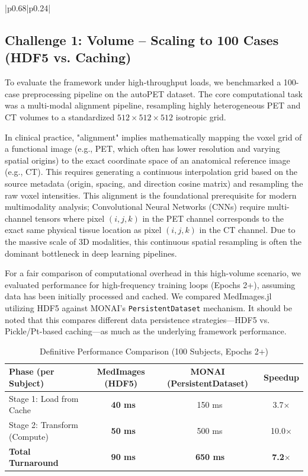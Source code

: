 \documentclass[10pt,letterpaper]{article}
\begin{document}
\begin{table}[H]
\begin{tabular}{|p{}|p{}|}
\subsection*{Challenge 1: Volume -- Scaling to 100 Cases (HDF5 vs. Caching)}
To evaluate the framework under high-throughput loads, we benchmarked a 100-case preprocessing pipeline on the autoPET dataset. The core computational task was a multi-modal alignment pipeline, resampling highly heterogeneous PET and CT volumes to a standardized $512 \times 512 \times 512$ isotropic grid. 

In clinical practice, "alignment" implies mathematically mapping the voxel grid of a functional image (e.g., PET, which often has lower resolution and varying spatial origins) to the exact coordinate space of an anatomical reference image (e.g., CT). This requires generating a continuous interpolation grid based on the source metadata (origin, spacing, and direction cosine matrix) and resampling the raw voxel intensities. This alignment is the foundational prerequisite for modern multimodality analysis; Convolutional Neural Networks (CNNs) require multi-channel tensors where pixel $(i,j,k)$ in the PET channel corresponds to the exact same physical tissue location as pixel $(i,j,k)$ in the CT channel. Due to the massive scale of 3D modalities, this continuous spatial resampling is often the dominant bottleneck in deep learning pipelines.

For a fair comparison of computational overhead in this high-volume scenario, we evaluated performance for high-frequency training loops (Epochs 2+), assuming data has been initially processed and cached. We compared MedImages.jl utilizing HDF5 against MONAI's \texttt{PersistentDataset} mechanism. It should be noted that this compares different data persistence strategies—HDF5 vs. Pickle/Pt-based caching—as much as the underlying framework performance.

\begin{table}[H]
\centering
\caption{Definitive Performance Comparison (100 Subjects, Epochs 2+)}
\begin{tabular}{|l|c|c|c|}
\hline
\textbf{Phase (per Subject)} & \textbf{MedImages (HDF5)} & \textbf{MONAI (PersistentDataset)} & \textbf{Speedup} \\
\hline
Stage 1: Load from Cache & \textbf{~40 ms} & ~150 ms & 3.7$\times$ \\
Stage 2: Transform (Compute) & \textbf{~50 ms} & ~500 ms & 10.0$\times$ \\
\hline
\textbf{Total Turnaround} & \textbf{~90 ms} & \textbf{~650 ms} & \textbf{7.2$\times$} \\
\hline
\end{tabular}
\label{tab:scaling_comparison}
\end{table}


\end{tabular}
\end{table}
\end{document}
